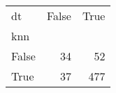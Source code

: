 \begin{tabular}{lrr}
\toprule
dt &  False &  True  \\
knn   &        &        \\
\midrule
False &     34 &     52 \\
True  &     37 &    477 \\
\bottomrule
\end{tabular}
